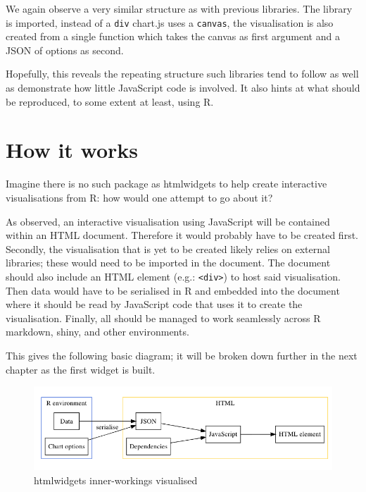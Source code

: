\documentclass[
  10pt,
]{krantz}
\begin{document}
We again observe a very similar structure as with previous libraries. The library is imported, instead of a \texttt{div} chart.js uses a \texttt{canvas}, the visualisation is also created from a single function which takes the canvas as first argument and a JSON of options as second.

Hopefully, this reveals the repeating structure such libraries tend to follow as well as demonstrate how little JavaScript code is involved. It also hints at what should be reproduced, to some extent at least, using R.

\hypertarget{widgets-basics-inner-workings}{%
\section{How it works}\label{widgets-basics-inner-workings}}

Imagine there is no such package as htmlwidgets to help create interactive visualisations from R: how would one attempt to go about it?

As observed, an interactive visualisation using JavaScript will be contained within an HTML document. Therefore it would probably have to be created first. Secondly, the visualisation that is yet to be created likely relies on external libraries; these would need to be imported in the document. The document should also include an HTML element (e.g.: \texttt{\textless{}div\textgreater{}}) to host said visualisation. Then data would have to be serialised in R and embedded into the document where it should be read by JavaScript code that uses it to create the visualisation. Finally, all should be managed to work seamlessly across R markdown, shiny, and other environments.

This gives the following basic diagram; it will be broken down further in the next chapter as the first widget is built.

\begin{figure}[H]

{\centering \includegraphics[width=1\linewidth]{images/03-htmlwidget-viz} 

}

\caption{htmlwidgets inner-workings visualised}\label{fig:widget-inner-diagram}
\end{figure}
\end{document}

